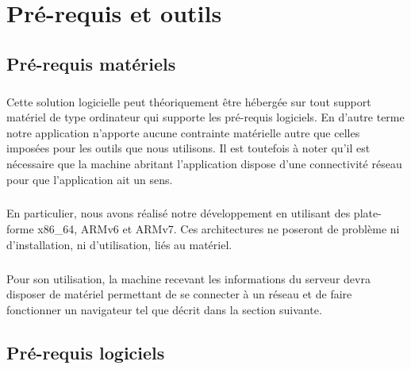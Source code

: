 \chapter{Pré-requis et outils}

\section{Pré-requis matériels}
    \paragraph{}
        Cette solution logicielle peut théoriquement être hébergée sur tout
        support matériel de type ordinateur qui supporte les pré-requis
        logiciels.
        En d'autre terme notre application n'apporte aucune contrainte
        matérielle autre que celles imposées pour les outils que nous
        utilisons.
        Il est toutefois à noter qu'il est nécessaire que la machine abritant
        l'application dispose d'une connectivité réseau pour que l'application
        ait un sens.
    \paragraph{}
        En particulier, nous avons réalisé notre développement en utilisant des plate-forme x86\_64, ARMv6 et ARMv7. Ces architectures ne poseront de problème ni d'installation, ni d'utilisation, liés au matériel.

    \paragraph{}
        Pour son utilisation, la machine recevant les informations du serveur
        devra disposer de matériel permettant de se connecter à un réseau et
        de faire fonctionner un navigateur tel que décrit dans la section
        suivante.

\section{Pré-requis logiciels}
